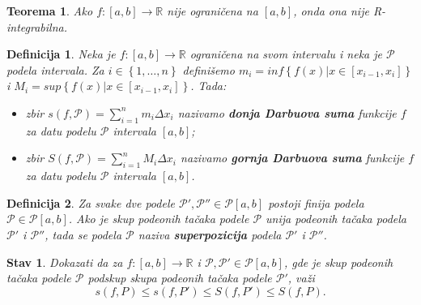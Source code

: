 \documentclass{article}
\newtheorem{definicija}{Definicija}[section]
\newtheorem{teorema}{Teorema}[section]
\newtheorem{stav}{Stav}[section]
\begin{document}
\begin{teoremabox}
    \label{teorema_2.1}
    \begin{teorema}
        Ako $f: \left[a,b\right]\longrightarrow\mathbb{R}$ nije ograničena na $\left[a,b\right]$, onda ona nije R-integrabilna.
    \end{teorema}
\end{teoremabox}

\begin{defbox}
    \label{definicija_2.4}
    \begin{definicija}
        Neka je $f:\left[a,b\right]\longrightarrow\mathbb{R}$ ograničena na svom intervalu i neka je $\mathcal{P}$ podela
        intervala. Za $i\in\left\{1,\dotsc,n\right\}$ definišemo $m_i=inf\left\{f\left(x\right)|x\in\left[x_{i-1},x_i\right]\right\}$ i $M_i=sup\left\{f\left(x\right)|x\in\left[x_{i-1},x_i\right]\right\}$.
        Tada:
        \begin{itemize}
            \item zbir $\displaystyle s\left(f,\mathcal{P}\right)=\sum_{i=1}^{n}m_i\Delta x_i$ nazivamo \textbf{donja Darbuova suma} funkcije $f$ za datu podelu $\mathcal{P}$ intervala $\left[a,b\right]$;
            \item zbir $S\left(f,\mathcal{P}\right)=\sum_{i=1}^{n}M_i\Delta x_i$ nazivamo \textbf{gornja Darbuova suma} funkcije $f$ za datu podelu $\mathcal{P}$ intervala $\left[a,b\right]$.
        \end{itemize}
    \end{definicija}
\end{defbox}

\begin{defbox}
    \label{definicija_2.5}
    \begin{definicija}
        Za svake dve podele $\mathcal{P}', \mathcal{P}''\in\mathcal{P}\left[a,b\right]$ postoji finija
        podela $\mathcal{P}\in\mathcal{P}\left[a,b\right]$. Ako je skup podeonih tačaka podele $\mathcal{P}$
        unija podeonih tačaka podela $\mathcal{P}'$ i $\mathcal{P}''$, tada se podela $\mathcal{P}$
        naziva \textbf{superpozicija} podela $\mathcal{P}'$ i $\mathcal{P}''$.
    \end{definicija}
\end{defbox}

\begin{stavbox}
    \label{stav_2.1}
    \begin{stav}
        \label{Stav_2.1}
        Dokazati da za $f: \left[a,b\right]\longrightarrow\mathbb{R}$ i
        $\mathcal{P},\mathcal{P'}\in \mathcal{P}\left[a,b\right]$, gde je skup podeonih tačaka podele $\mathcal{P}$ podskup
        skupa podeonih tačaka podele $\mathcal{P}'$, važi
        $$s\left(f,P\right)\leq s\left(f,P'\right)\leq S\left(f,P'\right)\leq S\left(f,P\right).$$
    \end{stav}
\end{stavbox}
\end{document}

